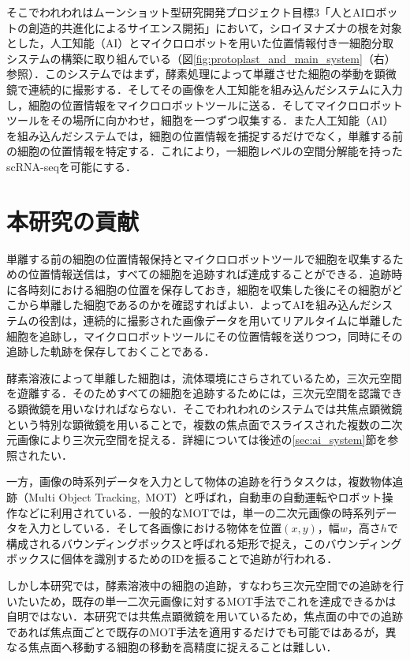 そこでわれわれはムーンショット型研究開発プロジェクト目標3「人とAIロボットの創造的共進化によるサイエンス開拓」\cite{moonshotHarada}において，シロイヌナズナの根を対象とした，人工知能（AI）とマイクロロボット\cite{ando2024single}を用いた位置情報付き一細胞分取システムの構築に取り組んでいる（図\ref{fig:protoplast_and_main_system}（右）参照）．このシステムではまず，酵素処理によって単離させた細胞の挙動を顕微鏡で連続的に撮影する．そしてその画像を人工知能を組み込んだシステムに入力し，細胞の位置情報をマイクロロボットツールに送る．そしてマイクロロボットツールをその場所に向かわせ，細胞を一つずつ収集する．また人工知能（AI）を組み込んだシステムでは，細胞の位置情報を捕捉するだけでなく，単離する前の細胞の位置情報を特定する．これにより，一細胞レベルの空間分解能を持ったscRNA-seqを可能にする．

\section{本研究の貢献}
\label{sec:contribution}

単離する前の細胞の位置情報保持とマイクロロボットツールで細胞を収集するための位置情報送信は，すべての細胞を追跡すれば達成することができる．追跡時に各時刻における細胞の位置を保存しておき，細胞を収集した後にその細胞がどこから単離した細胞であるのかを確認すればよい．よってAIを組み込んだシステムの役割は，連続的に撮影された画像データを用いてリアルタイムに単離した細胞を追跡し，マイクロロボットツールにその位置情報を送りつつ，同時にその追跡した軌跡を保存しておくことである．

酵素溶液によって単離した細胞は，流体環境にさらされているため，三次元空間を遊離する．そのためすべての細胞を追跡するためには，三次元空間を認識できる顕微鏡を用いなければならない．そこでわれわれのシステムでは共焦点顕微鏡という特別な顕微鏡を用いることで，複数の焦点面でスライスされた複数の二次元画像により三次元空間を捉える．詳細については後述の\ref{sec:ai_system}節を参照されたい．

一方，画像の時系列データを入力として物体の追跡を行うタスクは，複数物体追跡（Multi Object Tracking,\ MOT）と呼ばれ，自動車の自動運転やロボット操作などに利用されている．一般的なMOTでは，単一の二次元画像の時系列データを入力としている．そして各画像における物体を位置$(x, y)$，幅$w$，高さ$h$で構成されるバウンディングボックスと呼ばれる矩形で捉え，このバウンディングボックスに個体を識別するためのIDを振ることで追跡が行われる．

しかし本研究では，酵素溶液中の細胞の追跡，すなわち三次元空間での追跡を行いたいため，既存の単一二次元画像に対するMOT手法でこれを達成できるかは自明ではない．本研究では共焦点顕微鏡を用いているため，焦点面の中での追跡であれば焦点面ごとで既存のMOT手法を適用するだけでも可能ではあるが，異なる焦点面へ移動する細胞の移動を高精度に捉えることは難しい．

